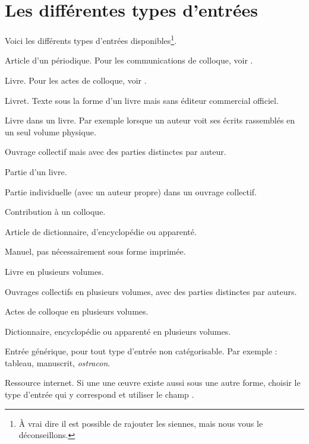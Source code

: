 \section{Les différentes types d'entrées}
Voici les différents types d'entrées disponibles\footnote{À vrai dire il est possible de rajouter les siennes, mais nous vous le déconseillons.}.


\begin{choix}

	\item[\type{article}] 
Article d'un périodique. Pour les communications de colloque, voir .
	\item[\type{book}] 
Livre. Pour les actes de colloque, voir  . 
	\item[\type{booklet}]
	Livret. Texte sous la forme d'un livre mais sans éditeur commercial officiel.
	\item[\type{bookinbook}]
	Livre dans un livre. Par exemple lorsque un auteur  voit ses écrits rassemblés en un seul volume physique. 	
	\item[\type{collection}]
	Ouvrage collectif mais avec des parties distinctes par auteur.
	\item[\type{inbook}]
	Partie d'un livre.
	\item[\type{incollection}]
	Partie individuelle (avec un auteur propre) dans un ouvrage collectif.
	\item[\type{inproceedings}]
	 Contribution à un colloque.
	 \item[\type{inreference}]
	 Article de dictionnaire, d'encyclopédie ou apparenté.
	\item[\type{manual}]
	 Manuel, pas nécessairement sous forme imprimée.
	 \item[\type{mvbook}]
	 Livre en plusieurs volumes.
	 \item[\type{mvcollection}]
	 Ouvrages collectifs en plusieurs volumes, avec des parties distinctes par auteurs.
	 \item[\type{mvproceedings}]
	 Actes de colloque en plusieurs volumes.
	 \item[\type{mvreference}]
	 Dictionnaire, encyclopédie ou apparenté en plusieurs volumes.
	\item[\type{misc}]
	 Entrée générique, pour tout type d'entrée non catégorisable. Par exemple : tableau, manuscrit, \emph{ostracon}. 
	\item[\type{online}]
	Ressource internet. Si une une œuvre existe aussi sous une autre forme, choisir le type d'entrée qui y correspond et utiliser le champ .

\end{choix}
